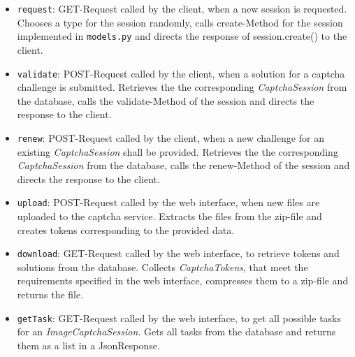 \begin{itemize}
\item \verb|request|: GET-Request called by the client, when a new session is requested. Chooses a type for the session randomly, calls create-Method for the session implemented in \verb|models.py| and directs the response of session.create() to the client.
\item \verb|validate|: POST-Request called by the client, when a solution for a captcha challenge is submitted. Retrieves the the corresponding \emph{CaptchaSession} from the database, calls the validate-Method of the session and directs the response to the client.
\item \verb|renew|: POST-Request called by the client, when a new challenge for an existing \emph{CaptchaSession} shall be provided. Retrieves the the corresponding \emph{CaptchaSession} from the database, calls the renew-Method of the session and directs the response to the client.
\item \verb|upload|: POST-Request called by the web interface, when new files are uploaded to the captcha service. Extracts the files from the zip-file and creates tokens corresponding to the provided data.
\item \verb|download|: GET-Request called by the web interface, to retrieve tokens and solutions from the database. Collects \emph{CaptchaTokens}, that meet the requirements specified in the web interface, compresses them to a zip-file and returns the file.
\item \verb|getTask|: GET-Request called by the web interface, to get all possible tasks for an \emph{ImageCaptchaSession}. Gets all tasks from the database and returns them as a list in a JsonResponse.
\end{itemize}


\clearpage

